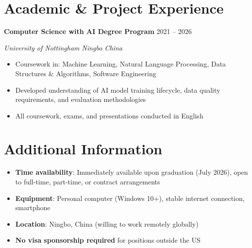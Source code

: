 \documentclass[11pt,a4paper]{article}
\begin{document}
\section{Academic \& Project Experience}

\textbf{Computer Science with AI Degree Program} \hfill 2021 -- 2026
\par\textit{University of Nottingham Ningbo China}
\begin{itemize}
  \item Coursework in: Machine Learning, Natural Language Processing, Data Structures \& Algorithms, Software Engineering
  \item Developed understanding of AI model training lifecycle, data quality requirements, and evaluation methodologies
  \item All coursework, exams, and presentations conducted in English
\end{itemize}

\section{Additional Information}

\begin{itemize}
  \item \textbf{Time availability}: Immediately available upon graduation (July 2026), open to full-time, part-time, or contract arrangements
  \item \textbf{Equipment}: Personal computer (Windows 10+), stable internet connection, smartphone
  \item \textbf{Location}: Ningbo, China (willing to work remotely globally)
  \item \textbf{No visa sponsorship required} for positions outside the US
\end{itemize}
\end{document}
